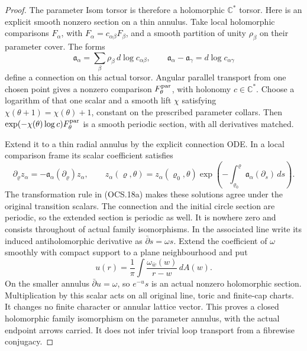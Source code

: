 \begin{proof}
The parameter Isom torsor is therefore a holomorphic
\(\mathbb C^*\) torsor. Here is an explicit smooth nonzero section
on a thin annulus. Take local holomorphic comparisons \(F_\alpha\),
with \(F_\alpha=c_{\alpha\beta}F_\beta\), and a smooth partition
of unity \(\rho_\beta\) on their parameter cover. The forms
\[
 \mathfrak a_\alpha=
       \sum_\beta\rho_\beta\,d\log c_{\alpha\beta},
 \qquad
 \mathfrak a_\alpha-\mathfrak a_\gamma
                         =d\log c_{\alpha\gamma}
\tag{OCS.18a}
\]
define a connection on this actual torsor. Angular parallel transport
from one chosen point gives a nonzero comparison \(F^{\rm par}_\theta\),
with holonomy \(c\in\mathbb C^*\). Choose a logarithm of that
one scalar and a smooth lift \(\chi\) satisfying
\(\chi(\theta+1)=\chi(\theta)+1\), constant on the prescribed
parameter collars. Then
\(\exp(-\chi(\theta)\log c)F^{\rm par}_\theta\) is a smooth
periodic section, with all derivatives matched.

Extend it to a thin radial annulus by the explicit connection ODE.
In a local comparison frame its scalar coefficient satisfies
\[
 \partial_\varrho z_\alpha
     =-\mathfrak a_\alpha(\partial_\varrho)z_\alpha,
 \qquad
 z_\alpha(\varrho,\theta)=z_\alpha(\varrho_0,\theta)
    \exp\left(-\int_{\varrho_0}^{\varrho}
           \mathfrak a_\alpha(\partial_s)\,ds\right).
\tag{OCS.18b}
\]
The transformation rule in (OCS.18a) makes these solutions agree
under the original transition scalars. The connection and the
initial circle section are periodic, so the extended section is
periodic as well. It is nowhere zero and consists throughout of
actual family isomorphisms.
In the associated line write its induced antiholomorphic derivative
as \(\bar\partial s=\omega s\). Extend the coefficient of
\(\omega\) smoothly with compact support to a plane neighbourhood
and put
\[
 u(r)=\frac1\pi\int\frac{\omega_{\bar w}(w)}{r-w}\,dA(w).
\tag{OCS.19}
\]
On the smaller annulus \(\bar\partial u=\omega\), so
\(e^{-u}s\) is an actual nonzero holomorphic section. Multiplication
by this scalar acts on all original line, toric and finite-cap
charts. It changes no finite character or annular lattice vector.
This proves a closed holomorphic family isomorphism on the parameter
annulus, with the actual endpoint arrows carried. It does not infer
trivial loop transport from a fibrewise conjugacy.


\end{proof}
